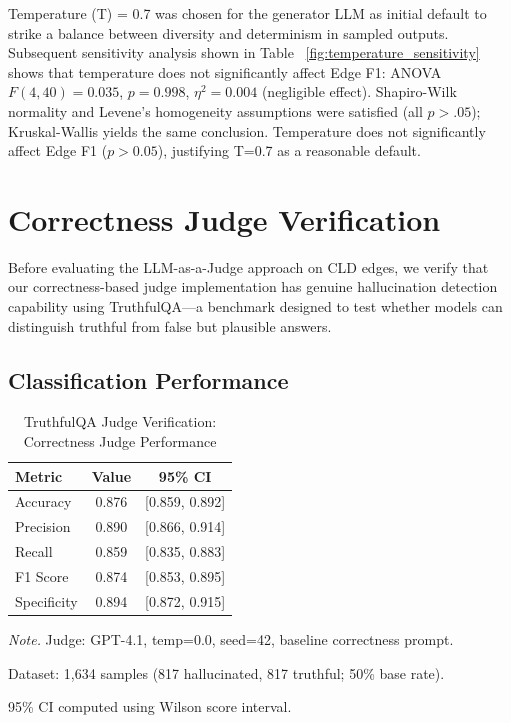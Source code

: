 \documentclass{article}
\begin{document}
Temperature (T) = 0.7 was chosen for the generator LLM as initial default to strike a balance between diversity and determinism in sampled outputs. Subsequent sensitivity analysis shown in Table ~\ref{fig:temperature_sensitivity} shows that temperature does not significantly affect Edge F1: ANOVA $F(4,40) = 0.035$, $p = 0.998$, $\eta^2 = 0.004$ (negligible effect). Shapiro-Wilk normality and Levene's homogeneity assumptions were satisfied (all $p > .05$); Kruskal-Wallis yields the same conclusion. Temperature does not significantly affect Edge F1 ($p > 0.05$), justifying T=0.7 as a reasonable default.



\section{Correctness Judge Verification}

Before evaluating the LLM-as-a-Judge approach on CLD edges, we verify that our correctness-based judge implementation has genuine hallucination detection capability using TruthfulQA---a benchmark designed to test whether models can distinguish truthful from false but plausible answers.

\subsection{Classification Performance}

\begin{table}[H]
\centering
\caption{TruthfulQA Judge Verification: Correctness Judge Performance}
\label{tab:truthqa_performance}
\begin{threeparttable}
\begin{tabular}{lcc}
\toprule
\textbf{Metric} & \textbf{Value} & \textbf{95\% CI} \\
\midrule
Accuracy & 0.876 & [0.859, 0.892] \\
Precision & 0.890 & [0.866, 0.914] \\
Recall & 0.859 & [0.835, 0.883] \\
F1 Score & 0.874 & [0.853, 0.895] \\
Specificity & 0.894 & [0.872, 0.915] \\
\bottomrule
\end{tabular}
\begin{tablenotes}
\small
\item \textit{Note.} Judge: GPT-4.1, temp=0.0, seed=42, baseline correctness prompt.
\item Dataset: 1,634 samples (817 hallucinated, 817 truthful; 50\% base rate).
\item 95\% CI computed using Wilson score interval.
\end{tablenotes}
\end{threeparttable}
\end{table}
\end{document}
